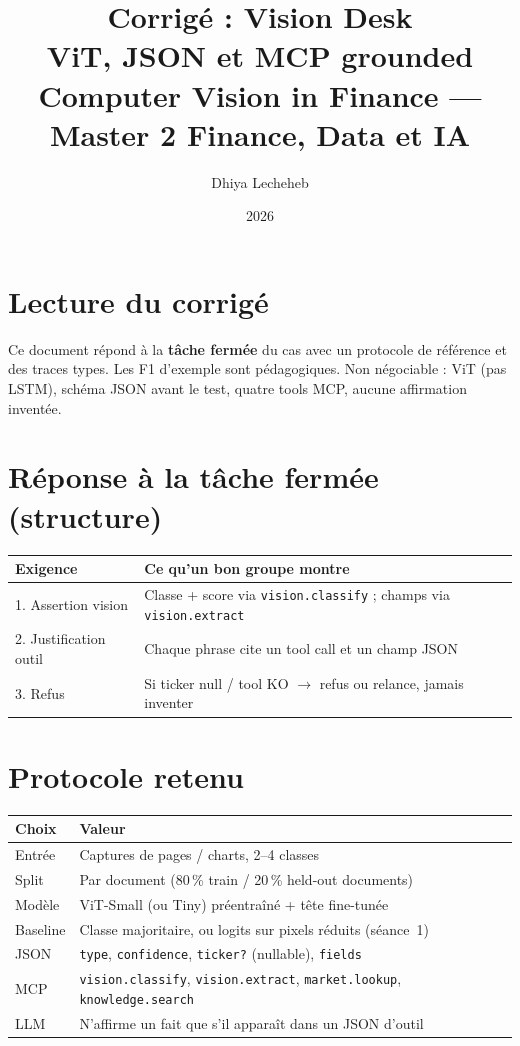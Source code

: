 \documentclass[11pt,a4paper]{article}
\title{%
  \textbf{Corrigé : Vision Desk}\\[0.35em]
  \large ViT, JSON et MCP grounded\\[0.5em]
  \normalsize Computer Vision in Finance --- Master 2 Finance, Data et IA
}
\author{Dhiya Lecheheb}
\date{2026}
\begin{document}
\maketitle
\thispagestyle{empty}

\section{Lecture du corrigé}

Ce document répond à la \textbf{tâche fermée} du cas avec un protocole de
référence et des traces types. Les F1 d'exemple sont pédagogiques.
Non négociable : ViT (pas LSTM), schéma JSON avant le test, quatre tools MCP,
aucune affirmation inventée.

\section{Réponse à la tâche fermée (structure)}

\begin{center}
\renewcommand{\arraystretch}{1.2}
\begin{tabular}{@{}p{4.0cm}p{10.6cm}@{}}
\toprule
\textbf{Exigence} & \textbf{Ce qu'un bon groupe montre} \\
\midrule
1. Assertion vision & Classe + score via \texttt{vision.classify} ; champs via \texttt{vision.extract} \\
2. Justification outil & Chaque phrase cite un tool call et un champ JSON \\
3. Refus & Si ticker null / tool KO $\rightarrow$ refus ou relance, jamais inventer \\
\bottomrule
\end{tabular}
\end{center}

\section{Protocole retenu}

\begin{center}
\renewcommand{\arraystretch}{1.15}
\begin{tabular}{@{}p{3.8cm}p{10.8cm}@{}}
\toprule
\textbf{Choix} & \textbf{Valeur} \\
\midrule
Entrée & Captures de pages / charts, 2--4 classes \\
Split & Par document (80\,\% train / 20\,\% held-out documents) \\
Modèle & ViT-Small (ou Tiny) préentraîné + tête fine-tunée \\
Baseline & Classe majoritaire, ou logits sur pixels réduits (séance~1) \\
JSON & \texttt{type}, \texttt{confidence}, \texttt{ticker?} (nullable), \texttt{fields} \\
MCP & \texttt{vision.classify}, \texttt{vision.extract}, \texttt{market.lookup}, \texttt{knowledge.search} \\
LLM & N'affirme un fait que s'il apparaît dans un JSON d'outil \\
\bottomrule
\end{tabular}
\end{center}
\end{document}
